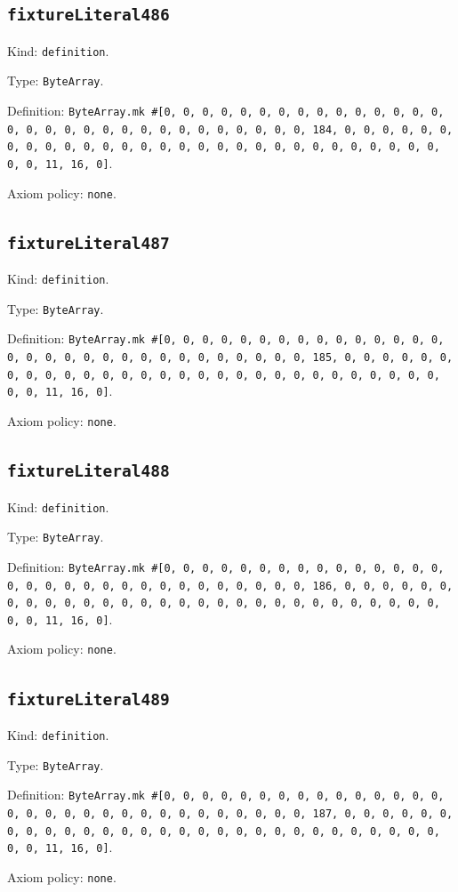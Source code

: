 \documentclass[11pt]{article}
\begin{document}
\subsection*{\texttt{fixtureLiteral486}}
\noindent Kind: \texttt{definition}.\par
\noindent Type: \texttt{ByteArray}.\par
\noindent Definition: \texttt{ByteArray.mk \#[0, 0, 0, 0, 0, 0, 0, 0, 0, 0, 0, 0, 0, 0, 0, 0, 0, 0, 0, 0, 0, 0, 0, 0, 0, 0, 0, 0, 0, 0, 0, 184, 0, 0, 0, 0, 0, 0, 0, 0, 0, 0, 0, 0, 0, 0, 0, 0, 0, 0, 0, 0, 0, 0, 0, 0, 0, 0, 0, 0, 0, 0, 0, 11, 16, 0]}.\par
\noindent Axiom policy: \texttt{none}.\par
\subsection*{\texttt{fixtureLiteral487}}
\noindent Kind: \texttt{definition}.\par
\noindent Type: \texttt{ByteArray}.\par
\noindent Definition: \texttt{ByteArray.mk \#[0, 0, 0, 0, 0, 0, 0, 0, 0, 0, 0, 0, 0, 0, 0, 0, 0, 0, 0, 0, 0, 0, 0, 0, 0, 0, 0, 0, 0, 0, 0, 185, 0, 0, 0, 0, 0, 0, 0, 0, 0, 0, 0, 0, 0, 0, 0, 0, 0, 0, 0, 0, 0, 0, 0, 0, 0, 0, 0, 0, 0, 0, 0, 11, 16, 0]}.\par
\noindent Axiom policy: \texttt{none}.\par
\subsection*{\texttt{fixtureLiteral488}}
\noindent Kind: \texttt{definition}.\par
\noindent Type: \texttt{ByteArray}.\par
\noindent Definition: \texttt{ByteArray.mk \#[0, 0, 0, 0, 0, 0, 0, 0, 0, 0, 0, 0, 0, 0, 0, 0, 0, 0, 0, 0, 0, 0, 0, 0, 0, 0, 0, 0, 0, 0, 0, 186, 0, 0, 0, 0, 0, 0, 0, 0, 0, 0, 0, 0, 0, 0, 0, 0, 0, 0, 0, 0, 0, 0, 0, 0, 0, 0, 0, 0, 0, 0, 0, 11, 16, 0]}.\par
\noindent Axiom policy: \texttt{none}.\par
\subsection*{\texttt{fixtureLiteral489}}
\noindent Kind: \texttt{definition}.\par
\noindent Type: \texttt{ByteArray}.\par
\noindent Definition: \texttt{ByteArray.mk \#[0, 0, 0, 0, 0, 0, 0, 0, 0, 0, 0, 0, 0, 0, 0, 0, 0, 0, 0, 0, 0, 0, 0, 0, 0, 0, 0, 0, 0, 0, 0, 187, 0, 0, 0, 0, 0, 0, 0, 0, 0, 0, 0, 0, 0, 0, 0, 0, 0, 0, 0, 0, 0, 0, 0, 0, 0, 0, 0, 0, 0, 0, 0, 11, 16, 0]}.\par
\noindent Axiom policy: \texttt{none}.\par
\end{document}
